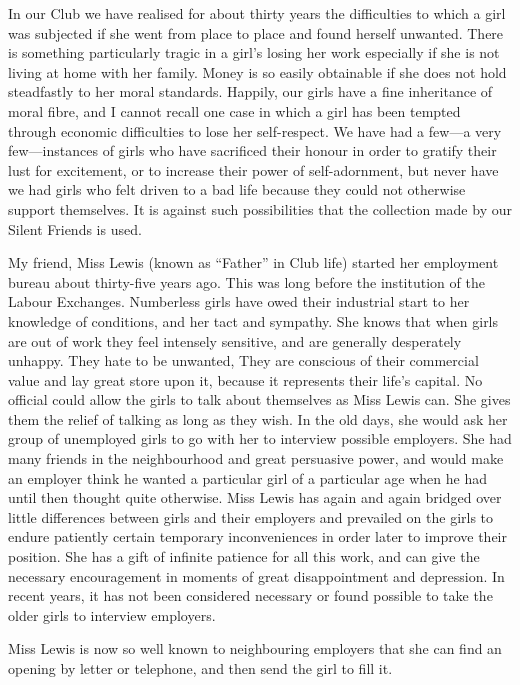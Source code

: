 In our Club we have realised for about thirty years
the difficulties to which a girl was subjected if she went
from place to place and found herself unwanted. There
is something particularly tragic in a girl’s losing her work
especially if she is not living at home with her family.
Money is so easily obtainable if she does not hold
steadfastly to her moral standards. Happily, our girls have a
fine inheritance of moral fibre, and I cannot recall one
case in which a girl has been tempted through economic
difficulties to lose her self-respect. We have had a
few—a very few—instances of girls who have sacrificed their
honour in order to gratify their lust for excitement, or to
increase their power of self-adornment, but never have
we had girls who felt driven to a bad life because they
could not otherwise support themselves. It is against such
possibilities that the collection made by our Silent Friends
is used.

My friend, Miss Lewis (known as “Father” in Club
life) started her employment bureau about thirty-five
years ago. This was long before the institution of the
Labour Exchanges. Numberless girls have owed their
industrial start to her knowledge of conditions,
and her tact and sympathy. She knows that when girls
are out of work they feel intensely sensitive, and are
generally desperately unhappy. They hate to be
unwanted, They are conscious of their commercial value
and lay great store upon it, because it represents their
life’s capital. No official could allow the girls to talk
about themselves as Miss Lewis can. She gives
them the relief of talking as long as they wish. In the old
days, she would ask her group of unemployed girls to go
with her to interview possible employers. She had many
friends in the neighbourhood and great persuasive power,
and would make an employer think he wanted a particular
girl of a particular age when he had until then thought
quite otherwise. Miss Lewis has again and again bridged
over little differences between girls and their employers
and prevailed on the girls to endure patiently certain
temporary inconveniences in order later to improve their
position. She has a gift of infinite patience for all this
work, and can give the necessary encouragement in
moments of great disappointment and depression. In
recent years, it has not been considered necessary or found
possible to take the older girls to interview employers.

Miss Lewis is now so well known to neighbouring
employers that she can find an opening by letter or
telephone, and then send the girl to fill it.

